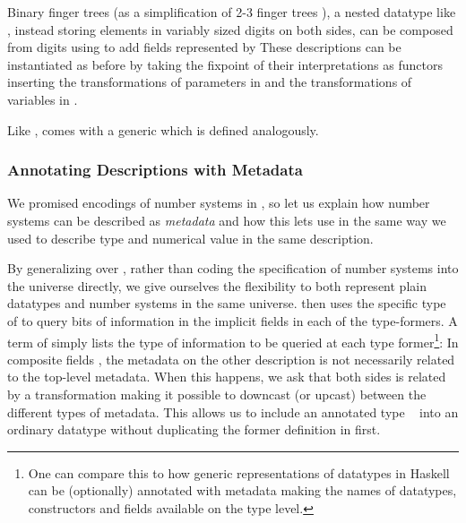 Binary finger trees (as a simplification of 2-3 finger trees \cite{fingertrees}), a nested datatype like , instead storing elements in variably sized digits on both sides, can be composed from digits
using  to add fields represented by 
These descriptions can be instantiated as before by taking the fixpoint%
of their interpretations as functors
inserting the transformations of parameters  in  and the transformations of variables  in .

Like ,  comes with a generic 
which is defined analogously.


\subsubsection{Annotating Descriptions with Metadata}
We promised encodings of number systems in , so let us explain how number systems can be described as \emph{metadata} and how this lets use  in the same way we used  to describe type and numerical value in the same description.

By generalizing  over , rather than coding the specification of number systems into the universe directly, we give ourselves the flexibility to both represent plain datatypes and number systems in the same universe.  then uses the specific type of  to query bits of information in the implicit fields in each of the type-formers. A term of  simply lists the type of information to be queried at each type former\footnote{One can compare this to how generic representations of datatypes in Haskell can be (optionally) annotated with metadata making the names of datatypes, constructors and fields available on the type level.}:
In composite fields , the metadata on the other description is not necessarily related to the top-level metadata. When this happens, we ask that both sides is related by a transformation
making it possible to downcast (or upcast) between the different types of metadata. This allows us to include an annotated type \  into an ordinary datatype  without duplicating the former definition in  first.

